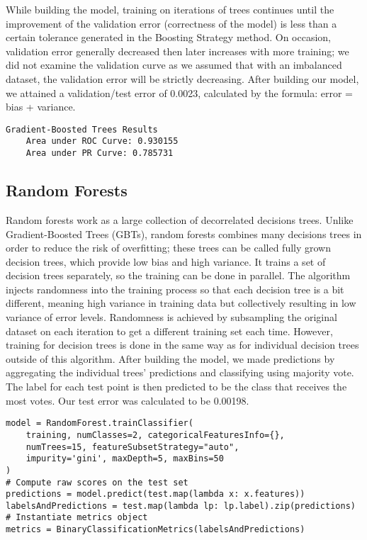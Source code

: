 \documentclass[9pt,twocolumn,twoside]{idsi}
\begin{document}
While building the model, training on iterations of trees continues until the improvement of the validation error (correctness of the model) is less than a certain tolerance generated in the Boosting Strategy method. On occasion, validation error generally decreased then later increases with more training; we did not examine the validation curve as we assumed that with an imbalanced dataset, the validation error will be strictly decreasing. After building our model, we attained a validation/test error of 0.0023, calculated by the formula: error = bias + variance.

\begin{lstlisting}
Gradient-Boosted Trees Results
	Area under ROC Curve: 0.930155
	Area under PR Curve: 0.785731
\end{lstlisting}

\subsection{Random Forests}
Random forests work as a large collection of decorrelated decisions trees. Unlike Gradient-Boosted Trees (GBTs), random forests combines many decisions trees in order to reduce the risk of overfitting; these trees can be called fully grown decision trees, which provide low bias and high variance.
It trains a set of decision trees separately, so the training can be done in parallel. The algorithm injects randomness into the training process so that each decision tree is a bit different, meaning high variance in training data but collectively resulting in low variance of error levels. Randomness is achieved by subsampling the original dataset on each iteration to get a different training set each time. However, training for decision trees is done in the same way as for individual decision trees outside of this algorithm.
After building the model, we made predictions by aggregating the individual trees’ predictions and classifying using majority vote. The label for each test point is then predicted to be the class that receives the most votes. Our test error was calculated to be 0.00198.

\begin{lstlisting}
model = RandomForest.trainClassifier(
    training, numClasses=2, categoricalFeaturesInfo={},
    numTrees=15, featureSubsetStrategy="auto",
    impurity='gini', maxDepth=5, maxBins=50
)    
# Compute raw scores on the test set
predictions = model.predict(test.map(lambda x: x.features))
labelsAndPredictions = test.map(lambda lp: lp.label).zip(predictions)    
# Instantiate metrics object
metrics = BinaryClassificationMetrics(labelsAndPredictions)
\end{lstlisting}
	
\end{document}
